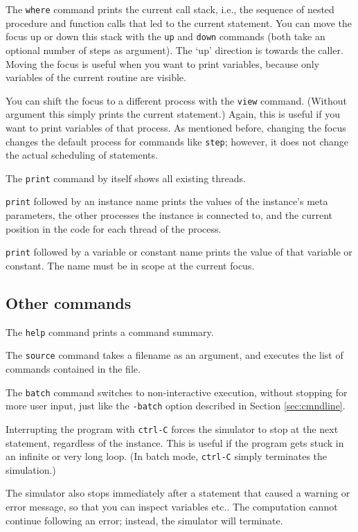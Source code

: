 The \verb|where| command prints the current call stack, i.e., the sequence
of nested procedure and function calls that led to the current statement.
You can move the focus up or down this stack with the \verb|up| and \verb|down|
commands (both take an optional number of steps as argument). The `up'
direction is towards the caller. Moving the focus is useful when you
want to print variables, because only variables of the current routine
are visible.

You can shift the focus to a different process with the \verb|view| command.
(Without argument this simply prints the current statement.) Again, this
is useful if you want to print variables of that process. As mentioned
before, changing the focus changes the default process for commands
like \verb|step|; however, it does not change the actual scheduling of statements.

The \verb|print| command by itself shows all existing threads.

\verb|print| followed by an instance name prints the values of the instance's
meta parameters, the other processes the instance is connected to,
and the current position in the code for each thread of the process.

\verb|print| followed by a variable or constant name prints the value of that
variable or constant. The name must be in scope at the current focus.


\subsection{Other commands}\label{sec:othercmnd}

The \verb|help| command prints a command summary.

The \verb|source| command takes a filename as an argument, and executes
the list of commands contained in the file.

The \verb|batch| command switches to non-interactive execution, without stopping
for more user input, just like the \verb|-batch| option described in Section
\ref{sec:cmndline}.

Interrupting the program with \verb|ctrl-C| forces the simulator to stop
at the next statement, regardless of the instance. This is useful if
the program gets stuck in an infinite or very long loop. (In batch mode,
\verb|ctrl-C| simply terminates the simulation.)

The simulator also stops immediately after a statement that
caused a warning or error message, so that you can inspect variables etc..
The computation cannot continue following an error; instead, the simulator
will terminate.

